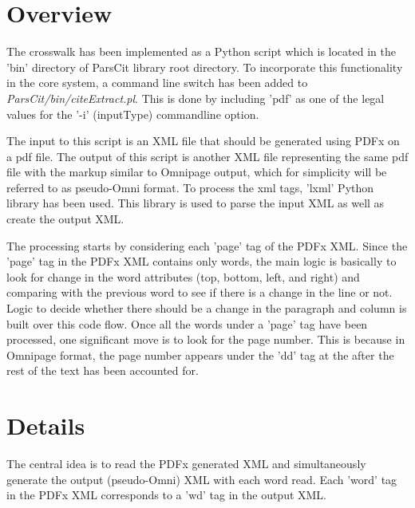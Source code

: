 \section{Overview}
The crosswalk has been implemented as a Python script which is located in the 'bin' directory of ParsCit library root directory.
To incorporate this functionality in the core system, a command line switch has been added to \emph{ParsCit/bin/citeExtract.pl}.
This is done by including 'pdf' as one of the legal values for the '-i' (inputType) commandline option.

The input to this script is an XML file that should be generated using PDFx on a pdf file.
The output of this script is another XML file representing the same pdf file with the markup similar to Omnipage output, which for simplicity will be referred to as pseudo-Omni format.
To process the xml tags, 'lxml' Python library has been used.
This library is used to parse the input XML as well as create the output XML.

The processing starts by considering each 'page' tag of the PDFx XML.
Since the 'page' tag in the PDFx XML contains only words, the main logic is basically to look for change in the word attributes (top, bottom, left, and right) and comparing with the previous word to see if there is a change in the line or not.
Logic to decide whether there should be a change in the paragraph and column is built over this code flow.
Once all the words under a 'page' tag have been processed, one significant move is to look for the page number.
This is because in Omnipage format, the page number appears under the 'dd' tag at the after the rest of the text has been accounted for.

\section{Details}
The central idea is to read the PDFx generated XML and simultaneously generate the output (pseudo-Omni) XML with each word read.
Each 'word' tag in the PDFx XML corresponds to a 'wd' tag in the output XML.

